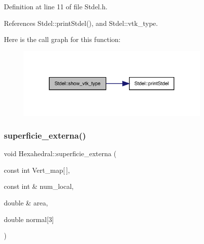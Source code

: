 Definition at line 11 of file Stdel.\+h.



References Stdel\+::print\+Stdel(), and Stdel\+::vtk\+\_\+type.

Here is the call graph for this function\+:
\nopagebreak
\begin{figure}[H]
\begin{center}
\leavevmode
\includegraphics[width=272pt]{classStdel_a56288a857b95a55c8b7eb5b473e836d9_cgraph}
\end{center}
\end{figure}
\mbox{\label{classHexahedral_a6debdf2dd1221b9e039b29cae8a4e517}} 
\subsubsection{\texorpdfstring{superficie\+\_\+externa()}{superficie\_externa()}\hspace{0.1cm}{\footnotesize\ttfamily [1/2]}}
{\footnotesize\ttfamily void Hexahedral\+::superficie\+\_\+externa (\begin{DoxyParamCaption}\item[{const int}]{Vert\+\_\+map\mbox{[}$\,$\mbox{]},  }\item[{const int \&}]{num\+\_\+local,  }\item[{double \&}]{area,  }\item[{double}]{normal\mbox{[}3\mbox{]} }\end{DoxyParamCaption})}

\mbox{\label{classHexahedral_a0ba51c2cf3ee2718366e6699fe20aaf4}} 
